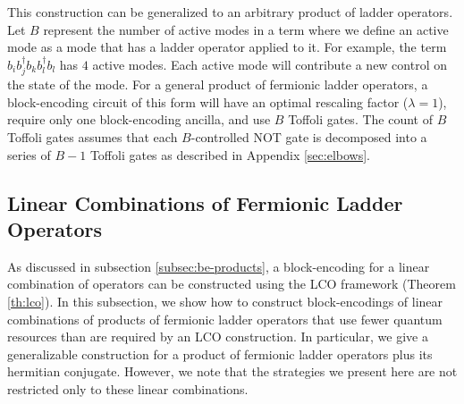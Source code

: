 This construction can be generalized to an arbitrary product of ladder operators.
Let $B$ represent the number of active modes in a term where we define an active mode as a mode that has a ladder operator applied to it.
For example, the term $b_i b_j^\dagger b_k b_l^\dagger b_l$ has $4$ active modes.
Each active mode will contribute a new control on the state of the mode.
For a general product of fermionic ladder operators, a block-encoding circuit of this form will have an optimal rescaling factor ($\lambda = 1$), require only one block-encoding ancilla, and use $B$ Toffoli gates.
The count of $B$ Toffoli gates assumes that each $B$-controlled NOT gate is decomposed into a series of $B-1$ Toffoli gates as described in Appendix \ref{sec:elbows}.


\subsection{Linear Combinations of Fermionic Ladder Operators}


As discussed in subsection \ref{subsec:be-products}, a block-encoding for a linear combination of operators can be constructed using the LCO framework (Theorem \ref{th:lco}).
In this subsection, we show how to construct block-encodings of linear combinations of products of fermionic ladder operators that use fewer quantum resources than are required by an LCO construction.
In particular, we give a generalizable construction for a product of fermionic ladder operators plus its hermitian conjugate.
However, we note that the strategies we present here are not restricted only to these linear combinations.


